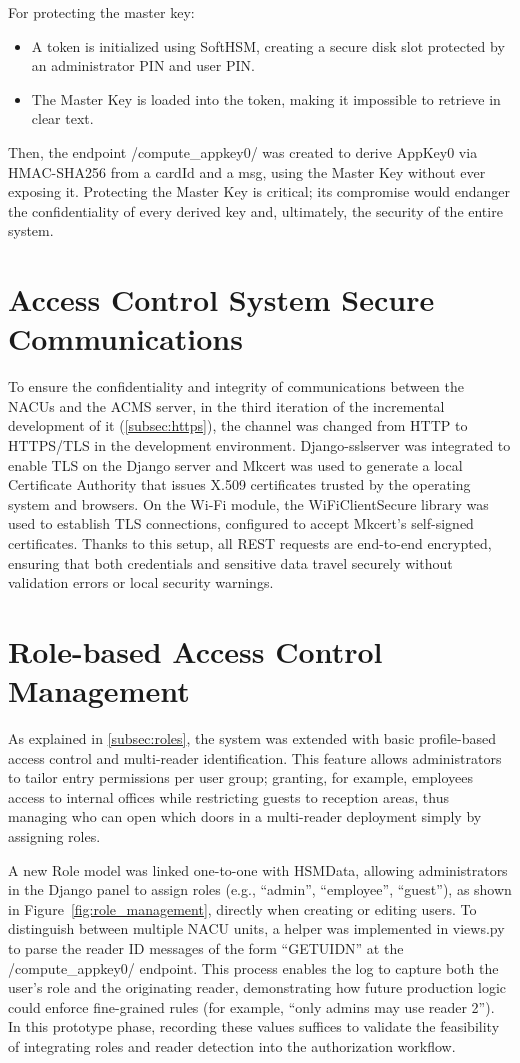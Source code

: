 For protecting the master key:
\begin{itemize}
	\item A token is initialized using SoftHSM, creating a secure disk slot protected by an administrator PIN and user PIN.
	\item The Master Key is loaded into the token, making it impossible to retrieve in clear text.
\end{itemize}

Then, the endpoint /compute\_appkey0/ was created to derive AppKey0 via HMAC-SHA256 from a cardId and a msg, using the Master Key without ever exposing it. Protecting the Master Key is critical; its compromise would endanger the confidentiality of every derived key and, ultimately, the security of the entire system.

\section{Access Control System Secure Communications}
To ensure the confidentiality and integrity of communications between the NACUs and the ACMS server, in the third iteration of the incremental development of it (\ref{subsec:https}), the channel was changed from HTTP to HTTPS/TLS in the development environment. Django-sslserver was integrated to enable TLS on the Django server and Mkcert was used to generate a local Certificate Authority that issues X.509 certificates trusted by the operating system and browsers. On the Wi-Fi module, the WiFiClientSecure library was used to establish TLS connections, configured to accept Mkcert's self-signed certificates. Thanks to this setup, all REST requests are end-to-end encrypted, ensuring that both credentials and sensitive data travel securely without validation errors or local security warnings.

\section{Role-based Access Control Management}
As explained in \ref{subsec:roles}, the system was extended with basic profile-based access control and multi-reader identification. This feature allows administrators to tailor entry permissions per user group; granting, for example, employees access to internal offices while restricting guests to reception areas, thus managing who can open which doors in a multi-reader deployment simply by assigning roles.

A new Role model was linked one-to-one with HSMData, allowing administrators in the Django panel to assign roles (e.g., “admin”, “employee”, “guest”), as shown in Figure~\ref{fig:role_management}, directly when creating or editing users. To distinguish between multiple NACU units, a helper was implemented in views.py to parse the reader ID messages of the form “GETUIDN” at the /compute\_appkey0/ endpoint. This process enables the log to capture both the user’s role and the originating reader, demonstrating how future production logic could enforce fine-grained rules (for example, “only admins may use reader 2”). In this prototype phase, recording these values suffices to validate the feasibility of integrating roles and reader detection into the authorization workflow.

